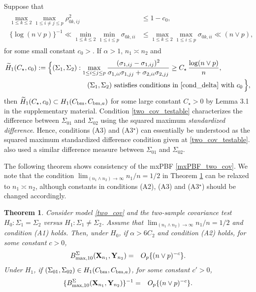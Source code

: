 \documentclass[11pt]{article}
\newtheorem{theorem}{Theorem}[section]
\newcommand{\bea}{\begin{eqnarray*}}
\newcommand{\eea}{\end{eqnarray*}}
\newcommand{\bean}{\begin{eqnarray}}
\newcommand{\eean}{\end{eqnarray}}
\newcommand{\bfX}{{\bf X}}
\newcommand{\bfY}{{\bf Y}}
\newcommand{\sg}{\Sigma}
\begin{document}
Suppose that
\bean\label{cond_delta}
\begin{split}
	\max_{1\le k \le 2}\max_{1\le i\neq j \le p}\rho_{0k,ij}^2 &\le 1 - c_0, \\
	\{\log(n\vee p) \}^{-1} \ll \min_{1\le k \le 2}\min_{1\le i \le p} \sigma_{0k,ii} &\le \max_{1\le k \le 2}\max_{1\le i \le p} \sigma_{0k,ii} \ll (n\vee p),
\end{split}
\eean
for some small constant $c_0>$.
If $\alpha>1$, $n_1\asymp n_2$ and
\bean\label{two_cov_testable}
\begin{split}
	\widetilde{H}_1(C_\star ,c_0) &:= \Big\{ (\sg_{1}, \sg_{2}): \max_{1\le i\le j\le p} \frac{ (\sigma_{1,ij} - \sigma_{1,ij})^2 }{ \sigma_{1,ii}\sigma_{1,jj} + \sigma_{2,ii}\sigma_{2,jj} } \ge C_\star  \, \frac{\log (n\vee p)}{n}, \\
	&\quad\quad\quad\quad\quad\quad\quad\,\, (\sg_1,\sg_2) \text{ satisfies conditions in } \eqref{cond_delta} \text{ with } c_0\,  \Big\} ,
\end{split}
\eean
then $\widetilde{H}_1(C_\star ,c_0) \subset {H}_1(C_{\rm bm}, C_{{\rm bm},a})$ for some large constant $C_\star>0$ by Lemma 3.1 in the supplementary material. 
Condition \eqref{two_cov_testable} characterizes the difference between $\sg_{01}$ and $\sg_{02}$ using the squared maximum {\it standardized difference}. 
Hence, conditions (A3) and (A3$^\star$) can essentially be understood as the squared maximum standardized difference condition given at \eqref{two_cov_testable}.
\cite{cai2013two} also used a similar difference measure between $\sg_{01}$ and $\sg_{02}$.

The following theorem shows consistency of the mxPBF \eqref{mxPBF_two_cov}. We note that the condition $\lim_{(n_1\wedge n_2)\to\infty} n_1/n = 1/2$ in Theorem \ref{thm:two_cov} can be relaxed to  $n_1\asymp n_2$, although constants in conditions (A2), (A3) and (A3$^\star$) should be changed accordingly.
\begin{theorem}\label{thm:two_cov}
	Consider model \eqref{two_cov} and the two-sample covariance test $H_0:\sg_1=\sg_2$ versus $H_1:\sg_1\neq \sg_2$.
	Assume that $\lim_{(n_1\wedge n_2)\to\infty} n_1/n = 1/2$ and condition (A1) holds.
	Then, under $H_0$, if $\alpha > 6C_2 $ and condition (A2) holds, for some constant $c>0$,
	\bea
	B_{\max,10}^{\sg}(\bfX_{n_1}, \bfY_{n_2})  &=&O_p\{(n\vee p)^{-c}\} .
	\eea
	Under $H_1$, if  $(\sg_{01}, \sg_{02}) \in H_1( C_{\rm bm} , C_{{\rm bm},a} )$, for some constant $c'>0$,
	\bea
	\{B_{\max,10}^{\sg}(\bfX_{n_1}, \bfY_{n_2})\}^{-1}  &=&O_p\{(n\vee p)^{-c}\} .
	\eea
\end{theorem}
\end{document}
